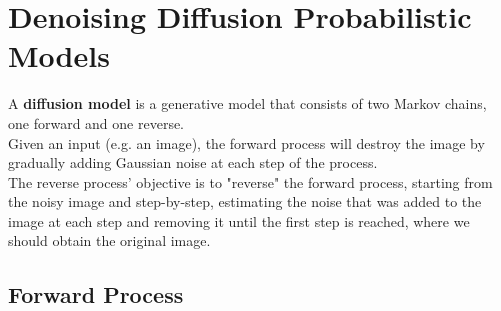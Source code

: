 \documentclass{article}
\begin{document}
\newpage
\section{Denoising Diffusion Probabilistic Models}

A \textbf{diffusion model} is a generative model that consists of two Markov chains, one forward and one reverse. \\
Given an input (e.g. an image), the forward process will destroy the image by gradually adding Gaussian noise at each step of the process. \cite{ho2020denoising} \\
The reverse process' objective is to "reverse" the forward process, starting from the noisy image and step-by-step, estimating the noise that was added to the image at each step and removing it until the first step is reached, where we should obtain the original image. \cite{ho2020denoising} \\

\subsection{Forward Process}
\end{document}
